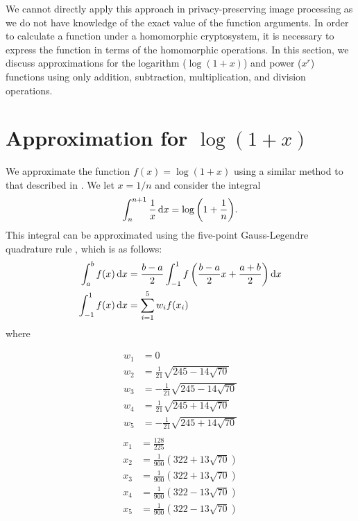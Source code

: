 We cannot directly apply this approach in privacy-preserving image processing as we do not have knowledge of the exact value of the function arguments. In order to calculate a function under a  homomorphic cryptosystem, it is necessary to express the function in terms of the homomorphic operations.
In this section, we discuss approximations for the logarithm ($\log(1+x)$) and power ($x^r$) functions using only addition, subtraction, multiplication, and division operations.

\section{Approximation for $\log(1+x)$}
\label{sec:logapproximation}
We approximate the function $f(x)=\log(1+x)$ using a similar method to that described in
\cite{khattri_new_2009}.
We let $x = 1/n$ and consider the integral
\begin{align*}
  \int_{n}^{n+1}{\frac{1}{x}\mathop{}\!\mathrm{d} x}=\log{\left(1+\frac{1}{n}\right)}.
\end{align*}
This integral can be approximated using the five-point Gauss-Legendre quadrature rule \cite{kythe_quadrature_2002}, which is as follows:
\begin{align*}
	\int_a^b{f(x)\mathop{}\!\mathrm{d} x}
	&= \frac{b-a}{2}\int_{-1}^{1}{f\left(\frac{b-a}{2}x+\frac{a+b}{2}\right)\mathop{}\!\mathrm{d} x}\\
	\int_{-1}^{1}{f(x)\mathop{}\!\mathrm{d} x} &= \sum_{i=1}^{5}{w_if(x_i)}
\end{align*}
where
\begin{multicols}{2}
	\noindent
	\begin{align*}
		w_1 &= 0\\
		w_2 &= \frac{1}{21}\sqrt{245-14\sqrt{70}}\\
		w_3 &= -\frac{1}{21}\sqrt{245-14\sqrt{70}}\\
		w_4 &= \frac{1}{21}\sqrt{245+14\sqrt{70}}\\
		w_5 &= -\frac{1}{21}\sqrt{245+14\sqrt{70}}\\
	\end{align*}
	\columnbreak
	\begin{align*}
		x_1 &= \frac{128}{225}\\
		x_2 &= \frac{1}{900}\left( 322 + 13\sqrt{70}\right)\\
		x_3 &= \frac{1}{900}\left( 322 + 13\sqrt{70}\right)\\
		x_4 &= \frac{1}{900}\left( 322 - 13\sqrt{70}\right)\\
		x_5 &= \frac{1}{900}\left( 322 - 13\sqrt{70}\right)\\
	\end{align*}
\end{multicols}
